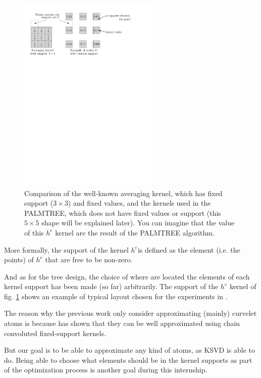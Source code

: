 \begin{figure}[!ht]\centering
\includegraphics[width=0.6\textwidth]{figures/example-kernel.pdf}
\caption{Comparison of the well-known averaging kernel, which has fixed support ($3\times3$) and fixed values, and the kernels used in the PALMTREE, which does not have fixed values or support (this $5\times5$ shape will be explained later). You can imagine that the value of this $h^e$ kernel are the result of the PALMTREE algorithm.\label{fig_example_kernel}}
\end{figure}
More formally, the support of the kernel $h^e$is defined as the element (i.e. the points) of $h^e$ that are free to be non-zero.

And as for the tree design, the choice of where are located the elements of each kernel support has been made (so far) arbitrarily. The support of the $h^e$ kernel of fig. \ref{fig_example_kernel} shows an example of typical layout chosen for the experiments in \cite{chabiron_optimization_2016}. 

The reason why the previous work only consider approximating (mainly) curvelet atoms is because \cite{chabiron_apprentissage_2015} has shown that they can be well approximated using chain convoluted fixed-support kernels.

But our goal is to be able to approximate any kind of atoms, as \ac{KSVD} is able to do. Being able to choose what elements should be in the kernel supports as part of the optimization process is another goal during this internship.

